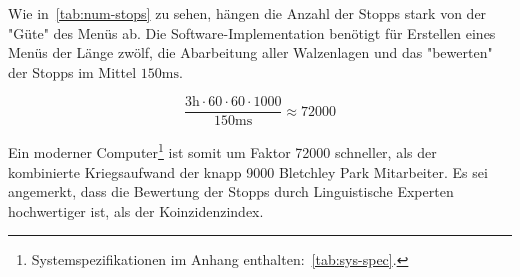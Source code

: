 \begin{table}
	\centering
	\caption{Geschätzte Anzahl der Stopps pro Walzenlage~\autocite{enwiki:bombe}}
	\label{tab:num-stops}
\end{table}

\smallskip
Wie in~\cref{tab:num-stops} zu sehen, hängen die Anzahl der Stopps stark von der "Güte" des Menüs ab.
Die Software-Implementation benötigt für Erstellen eines Menüs der Länge zwölf, die Abarbeitung aller Walzenlagen und das "bewerten" der Stopps im Mittel
$150\si{\ms}$.

\[
\frac{3\si{\hour} \cdot 60 \cdot 60 \cdot 1000}{150\si{\ms}} \approx 72000
\]

Ein moderner Computer\footnote{Systemspezifikationen im Anhang enthalten:~\cref{tab:sys-spec}.} ist somit um Faktor 72000 schneller, als der kombinierte Kriegsaufwand der knapp 9000 Bletchley Park Mitarbeiter.
Es sei angemerkt, dass die Bewertung der Stopps durch Linguistische Experten hochwertiger ist, als der Koinzidenzindex.

